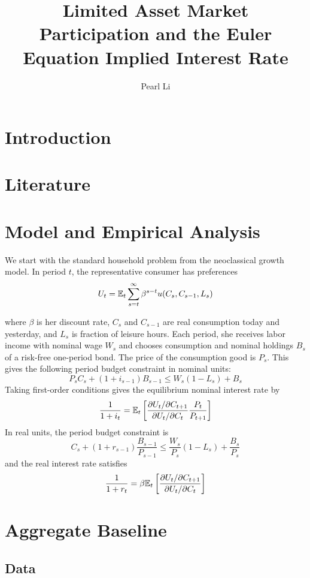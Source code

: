 \documentclass{thesis}
\begin{document}
\title{Limited Asset Market Participation and the Euler Equation Implied Interest Rate}
\author{Pearl Li}
\maketitle \newpage
\tableofcontents \newpage



\section{Introduction}

\section{Literature}
\cite{canzoneri07}

\section{Model and Empirical Analysis}
We start with the standard household problem from the neoclassical growth model. In period $t$, the representative consumer has preferences $$U_t = \mathbb{E}_t \sum_{s=t}^\infty \beta^{s-t} u(C_s, C_{s-1}, L_s)$$

 where $\beta$ is her discount rate, $C_s$ and $C_{s-1}$ are real consumption today and yesterday, and $L_s$ is fraction of leisure hours. Each period, she receives labor income with nominal wage $W_s$ and chooses consumption and nominal holdings $B_s$ of a risk-free one-period bond. The price of the consumption good is $P_s$. This gives the following period budget constraint in nominal units: $$P_s C_s + (1 + i_{s-1})B_{s-1} \leq W_s(1 - L_s) + B_s$$
Taking first-order conditions gives the equilibrium nominal interest rate by $$\frac{1}{1 + i_t} = \mathbb{E}_t \left[  \frac{\partial U_t / \partial C_{t+1}}{\partial U_t / \partial C_t} \frac{P_t}{P_{t+1}}  \right]$$
In real units, the period budget constraint is $$C_s + (1 + r_{s-1}) \frac{B_{s-1}}{P_{s-1}} \leq \frac{W_s}{P_s}(1 - L_s) + \frac{B_s}{P_s}$$ and the real interest rate satisfies $$\frac{1}{1 + r_t} = \beta \mathbb{E}_t \left[  \frac{\partial U_t / \partial C_{t+1}}{\partial U_t / \partial C_t}  \right]$$


\section{Aggregate Baseline}
\subsection{Data}
\end{document}
